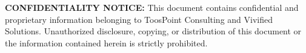 \documentclass{toospoint}
\begin{document}
\vspace{20pt}

\noindent
{}
\hfill
{}

\vspace{32pt}

\begin{mdframed}[
  linecolor=TPBorder,
  linewidth=1pt,
  roundcorner=4pt,
  backgroundcolor=TPLight,
  innerleftmargin=14pt,
  innerrightmargin=14pt,
  innertopmargin=10pt,
  innerbottommargin=10pt
]
\sffamily\footnotesize\color{TPGray}
\textbf{CONFIDENTIALITY NOTICE:} This document contains confidential and
proprietary information belonging to ToosPoint Consulting and Vivified
Solutions. Unauthorized disclosure, copying, or distribution of this document
or the information contained herein is strictly prohibited.
\end{mdframed}
\end{document}

